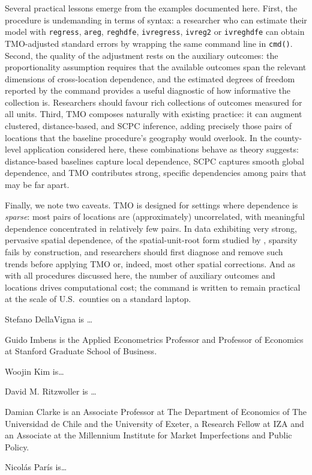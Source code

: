 \documentclass[varwidth,bib]{statapress}
\begin{document}
Several practical lessons emerge from the examples documented here.  First, the procedure is undemanding in terms of syntax: a researcher who can estimate their model with {\tt regress}, {\tt areg}, {\tt reghdfe}, {\tt ivregress}, {\tt ivreg2} or {\tt ivreghdfe} can obtain TMO-adjusted standard errors by wrapping the same command line in {\tt cmd()}.  Second, the quality of the adjustment rests on the auxiliary outcomes: the proportionality assumption requires that the available outcomes span the relevant dimensions of cross-location dependence, and the estimated degrees of freedom reported by the command provides a useful diagnostic of how informative the collection is.  Researchers should favour rich collections of outcomes measured for all units.  Third, TMO composes naturally with existing practice: it can augment clustered, distance-based, and SCPC inference, adding precisely those pairs of locations that the baseline procedure's geography would overlook.  In the county-level application considered here, these combinations behave as theory suggests: distance-based baselines capture local dependence, SCPC captures smooth global dependence, and TMO contributes strong, specific dependencies among pairs that may be far apart.

Finally, we note two caveats.  TMO is designed for settings where dependence is \textit{sparse}: most pairs of locations are (approximately) uncorrelated, with meaningful dependence concentrated in relatively few pairs.  In data exhibiting very strong, pervasive spatial dependence, of the spatial-unit-root form studied by \citet{MullerWatson2024}, sparsity fails by construction, and researchers should first diagnose and remove such trends before applying TMO or, indeed, most other spatial corrections.  And as with all procedures discussed here, the number of auxiliary outcomes and locations drives computational cost; the command is written to remain practical at the scale of U.S.\ counties on a standard laptop.

\clearpage

    
    
    
    \clearpage
    \begin{aboutauthors}
    Stefano DellaVigna is \ldots

    Guido Imbens is the Applied Econometrics Professor and Professor of Economics at Stanford Graduate School of Business.

    Woojin Kim is\ldots 
    
    David M. Ritzwoller is \ldots

    Damian Clarke is an Associate Professor at The Department of Economics of The Universidad de Chile and the University of Exeter, a Research Fellow at IZA and an Associate at the Millennium Institute for Market Imperfections and Public Policy.  
    

    Nicol\'as Par\'is is\ldots
    \end{aboutauthors}
\end{document}
